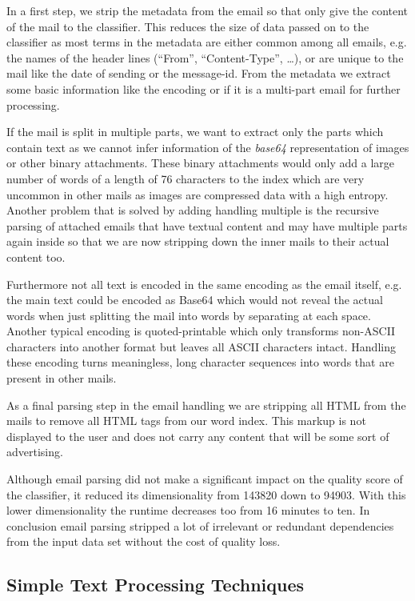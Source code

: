 In a first step, we strip the metadata from the email so that only give the content of the mail to the classifier.
This reduces the size of data passed on to the classifier as most terms in the metadata are either common among all emails, e.g. the names of the header lines (``From'', ``Content-Type'', \dots), or are unique to the mail like the date of sending or the message-id.
From the metadata we extract some basic information like the encoding or if it is a multi-part email for further processing.

If the mail is split in multiple parts, we want to extract only the parts which contain text as we cannot infer information of the \emph{base64} representation of images or other binary attachments.
These binary attachments would only add a large number of words of a length of 76 characters \cite{rfc2045} to the index which are very uncommon in other mails as images are compressed data with a high entropy.
Another problem that is solved by adding handling multiple is the recursive parsing of attached emails that have textual content and may have multiple parts again inside so that we are now stripping down the inner mails to their actual content too.

Furthermore not all text is encoded in the same encoding as the email itself, e.g. the main text could be encoded as Base64 which would not reveal the actual words when just splitting the mail into words by separating at each space.
Another typical encoding is quoted-printable which only transforms non-ASCII characters into another format but leaves all ASCII characters intact.
Handling these encoding turns meaningless, long character sequences into words that are present in other mails.

As a final parsing step in the email handling we are stripping all HTML from the mails to remove all HTML tags from our word index.
This markup is not displayed to the user and does not carry any content that will be some sort of advertising.

Although email parsing did not make a significant impact on the quality score of the classifier, it reduced its dimensionality from 143820 down to 94903.
With this lower dimensionality the runtime decreases too from 16 minutes to ten.
In conclusion email parsing stripped a lot of irrelevant or redundant dependencies from the input data set without the cost of quality loss.

\subsection{Simple Text Processing Techniques}

